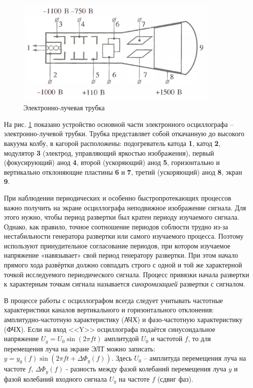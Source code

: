 \documentclass[a4paper,12pt]{article} %
\begin{document}
\begin{figure}
	\includegraphics[width=10cm]{truba.png}
	\caption{Электронно-лучевая трубка}
	\label{ELT}
\end{figure}

На рис. \ref{ELT} показано устройство основной части электронного осциллографа -- электронно-лучевой трубки. Трубка представляет собой откачанную до высокого вакуума колбу, в кагорой расположены: подогреватель катода \textbf{1}, катод \textbf{2}, модулятор \textbf{3} (электрод, управляющий яркостью изображения), первый (фокусирующий) анод \textbf{4}, второй (ускоряющий) анод \textbf{5}, горизонтально и вертикально отклоняющие пластины \textbf{6} и \textbf{7}, третий (ускоряющий) анод \textbf{8}, экран \textbf{9}. 

При наблюдении периодических и особенно быстропротекающих процессов важно получить на экране осциллографа неподвижное изображение сигнала. Для этого нужно, чтобы период развертки был кратен периоду изучаемого сигнала. Однако, как правило, точное соотношение периодов соблюсти трудно из-за нестабильности генератора развертки или самого изучаемого процесса. Поэтому используют принудительное согласование периодов, при котором изучаемое напряжение «навязывает» свой период генератору развертки. При этом начало прямого хода развёртки должно совпадать строго с одной и той же характерной точкой исследуемого периодического сигнала. Процесс привязки начала развертки к характерным точкам сигнала называется \textit{синхронизацией} развертки с сигналом.

В процессе работы с осциллографом всегда следует учитывать частотные характеристики каналов вертикального и горизонтального отклонения: амплитудно-частотную характеристику (АЧХ) и фазо-­частотную характеристику (ФЧХ). Если на вход <<Y>> осциллографа подаётся синусоидальное напряжение $ U_y=U_0\sin\left(2\pi ft\right) $ амплитудой $ U_0 $ и частотой $ f $, то для перемещения луча на экране ЭЛТ можно записать: $ y=y_0\left(f\right)\sin\left(2\pi ft + \Delta\Phi_y\left(f\right)\right) $. Здесь $ U_0 $ -- амплитуда перемещения луча на частоте $ f $, $ \Delta\Phi_y\left(f\right) $ - разность между фазой колебаний перемещения луча $ y $ и фазой колебаний входного сигнала $ U_y $ на частоте $ f $ (сдвиг фаз).
\end{document}
